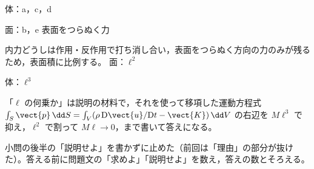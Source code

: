 体：a，c，d

面：b，e
表面をつらぬく力

内力どうしは作用・反作用で打ち消し合い，表面をつらぬく方向の力のみが残るため，表面積に比例する。
面：$\ell^{2}$

体：$\ell^{3}$

\item 「$\ell$ の何乗か」は説明の材料で，それを使って移項した運動方程式 $\int_{S}\vect{p}\,\dd S=\int_{V}(\rho\,\mathrm{D}\vect{u}/\mathrm{D}t-\vect{K})\,\dd V$ の右辺を $M\ell^{3}$ で抑え，$\ell^{2}$ で割って $M\ell\to0$，まで書いて答えになる。
\item {} 小問の後半の「説明せよ」を書かずに止めた（前回は「理由」の部分が抜けた）。答える前に問題文の「求めよ」「説明せよ」を数え，答えの数とそろえる。
